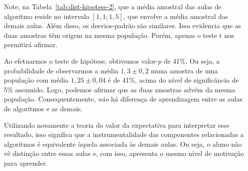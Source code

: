 Note, na Tabela~\ref{tab:dist-hipotese-2}, que a média amostral das aulas de algoritmo reside no intervalo $[1,1; 1,5]$, que envolve a média amostral das demais aulas.
Além disso, os desvios-padrão são similares.
Isso evidencia que as duas amostras têm origem na mesma população.
Porém, apenas o teste t nos permitirá afirmar.

Ao efetuarmos o teste de hipótese, obtivemos valor-$p$ de 41\%.
Ou seja, a probabilidade de observarmos a média $1,3 \pm 0,2$ numa amostra de uma população com média $1,25 \pm 0,04$ é de 41\%, acima do nível de significância de 5\% assumido.
Logo, podemos afirmar que as duas amostras advém da mesma população.
Consequentemente, \emph{não} há diferença de aprendizagem entre as aulas de algoritmos e as demais.

Utilizando novamente a teoria do valor da expectativa para interpretar esse resultado, isso significa que a instrumentalidade das componentes relacionadas a algoritmos é equivalente àquela associada às demais aulas.
Ou seja, o aluno não vê distinção entre essas aulas e, com isso, apresenta o mesmo nível de motivação para aprender.